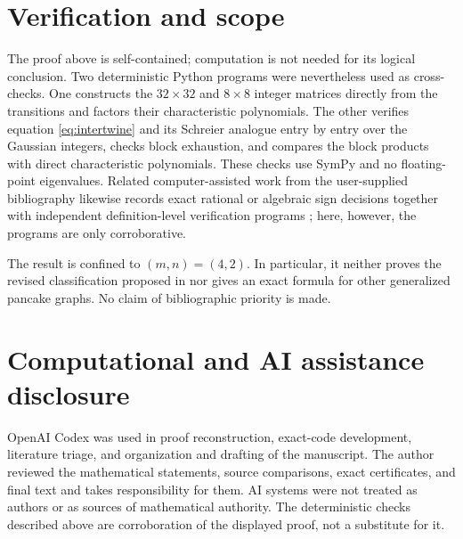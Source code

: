 \documentclass[11pt]{article}
\begin{document}
\section{Verification and scope}

The proof above is self-contained; computation is not needed for its logical
conclusion.  Two deterministic Python programs were nevertheless used as
cross-checks.  One constructs the $32\times32$ and $8\times8$ integer
matrices directly from the transitions and factors their characteristic
polynomials.  The other verifies equation \eqref{eq:intertwine} and its
Schreier analogue entry by entry over the Gaussian integers, checks block
exhaustion, and compares the block products with direct characteristic
polynomials.  These checks use SymPy \cite{MeurerEtAl2017} and no
floating-point eigenvalues.  Related computer-assisted work from the
user-supplied bibliography likewise records exact rational or algebraic sign
decisions together with independent definition-level verification programs
\cite{ZengEtAl2026}; here, however, the programs are only corroborative.

The result is confined to $(m,n)=(4,2)$.  In particular, it neither proves
the revised classification proposed in \cite{Blanco2026} nor gives an exact
formula for other generalized pancake graphs.  No claim of bibliographic
priority is made.

\section*{Computational and AI assistance disclosure}

OpenAI Codex was used in proof reconstruction, exact-code development,
literature triage, and organization and drafting of the manuscript.  The
author reviewed the mathematical statements, source comparisons, exact
certificates, and final text and takes responsibility for them.  AI systems
were not treated as authors or as sources of mathematical authority.  The
deterministic checks described above are corroboration of the displayed
proof, not a substitute for it.



\end{document}
